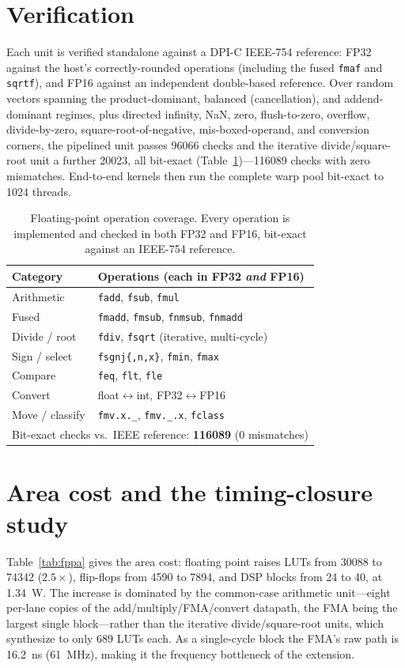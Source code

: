 \documentclass[12pt,a4paper,oneside]{report}
\newcommand{\code}[1]{\texttt{#1}}
\begin{document}
\section{Verification}
Each unit is verified standalone against a DPI-C IEEE-754 reference: FP32 against
the host's correctly-rounded operations (including the fused \code{fmaf} and
\code{sqrtf}), and FP16 against an independent double-based reference. Over random
vectors spanning the product-dominant, balanced (cancellation), and
addend-dominant regimes, plus directed infinity, NaN, zero, flush-to-zero,
overflow, divide-by-zero, square-root-of-negative, mis-boxed-operand, and
conversion corners, the pipelined unit passes \num{96066} checks and the iterative
divide/square-root unit a further \num{20023}, all bit-exact
(Table~\ref{tab:fpverif})---\num{116089} checks with zero mismatches. End-to-end
kernels then run the complete warp pool bit-exact to 1024 threads.

\begin{table}[t]
\caption{Floating-point operation coverage. Every operation is implemented and
checked in both FP32 and FP16, bit-exact against an IEEE-754 reference.}
\label{tab:fpverif}
\centering
\small
\begin{tabular}{ll}
\toprule
Category & Operations (each in FP32 \emph{and} FP16)\\
\midrule
Arithmetic     & \code{fadd}, \code{fsub}, \code{fmul}\\
Fused          & \code{fmadd}, \code{fmsub}, \code{fnmsub}, \code{fnmadd}\\
Divide / root  & \code{fdiv}, \code{fsqrt} (iterative, multi-cycle)\\
Sign / select  & \code{fsgnj\{,n,x\}}, \code{fmin}, \code{fmax}\\
Compare        & \code{feq}, \code{flt}, \code{fle}\\
Convert        & float$\leftrightarrow$int, FP32$\leftrightarrow$FP16\\
Move / classify& \code{fmv.x.\_}, \code{fmv.\_.x}, \code{fclass}\\
\midrule
\multicolumn{2}{l}{Bit-exact checks vs.\ IEEE reference:
\textbf{\num{116089}} (0 mismatches)}\\
\bottomrule
\end{tabular}
\end{table}

\section{Area cost and the timing-closure study}
\label{sec:fppa}
Table~\ref{tab:fppa} gives the area cost: floating point raises LUTs from
\num{30088} to \num{74342} ($2.5\times$), flip-flops from \num{4590} to \num{7894},
and DSP blocks from 24 to 40, at \SI{1.34}{\watt}. The increase is dominated by
the common-case arithmetic unit---eight per-lane copies of the
add/multiply/FMA/convert datapath, the FMA being the largest single block---rather
than the iterative divide/square-root units, which synthesize to only \num{689}
LUTs each. As a single-cycle block the FMA's raw path is \SI{16.2}{\nano\second}
(\SI{61}{\mega\hertz}), making it the frequency bottleneck of the extension.
\end{document}
